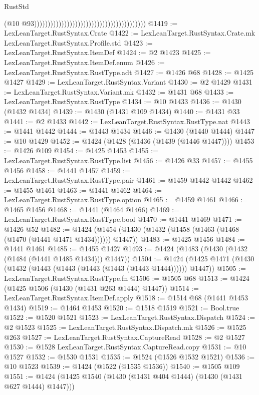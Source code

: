 \begin{lexlean}{RustStd}
\begin{coremodule}
                                                                                    (@10
                                                                                      @93)))))))))))))))))))))))))))))))))))))))))
@1419 := LexLeanTarget.RustSyntax.Crate
@1422 := LexLeanTarget.RustSyntax.Crate.mk LexLeanTarget.RustSyntax.Profile.std
@1423 := LexLeanTarget.RustSyntax.ItemDef
@1424 := @2 @1423
@1425 := LexLeanTarget.RustSyntax.ItemDef.enum
@1426 := LexLeanTarget.RustSyntax.RustType.adt
@1427 := @1426 @68
@1428 := @1425 @1427
@1429 := LexLeanTarget.RustSyntax.Variant
@1430 := @2 @1429
@1431 := LexLeanTarget.RustSyntax.Variant.mk
@1432 := @1431 @68
@1433 := LexLeanTarget.RustSyntax.RustType
@1434 := @10 @1433
@1436 := @1430 (@1432 @1434)
@1439 := @1430 (@1431 @109 @1434)
@1440 := @1431 @33
@1441 := @2 @1433
@1442 := LexLeanTarget.RustSyntax.RustType.nat
@1443 := @1441 @1442
@1444 := @1443 @1434
@1446 := @1430 (@1440 @1444)
@1447 := @10 @1429
@1452 := @1424 (@1428 (@1436 (@1439 (@1446 @1447))))
@1453 := @1426 @109
@1454 := @1425 @1453
@1455 := LexLeanTarget.RustSyntax.RustType.list
@1456 := @1426 @33
@1457 := @1455 @1456
@1458 := @1441 @1457
@1459 := LexLeanTarget.RustSyntax.RustType.pair
@1461 := @1459 @1442 @1442
@1462 := @1455 @1461
@1463 := @1441 @1462
@1464 := LexLeanTarget.RustSyntax.RustType.option
@1465 := @1459 @1461
@1466 := @1465 @1456
@1468 := @1441 (@1464 @1466)
@1469 := LexLeanTarget.RustSyntax.RustType.bool
@1470 := @1441 @1469
@1471 := @1426 @52
@1482 := @1424 (@1454 (@1430 (@1432 (@1458 (@1463 (@1468 (@1470 (@1441 @1471 @1434)))))) @1447))
@1483 := @1425 @1456
@1484 := @1441 @1461
@1485 := @1455 @1427
@1493 := @1424 (@1483 (@1430 (@1432 (@1484 (@1441 @1485 @1434))) @1447))
@1504 := @1424 (@1425 @1471 (@1430 (@1432 (@1443 (@1443 (@1443 (@1443 (@1443 @1444)))))) @1447))
@1505 := LexLeanTarget.RustSyntax.RustType.fn
@1506 := @1505 @68
@1513 := @1424 (@1425 @1506 (@1430 (@1431 @263 @1444) @1447))
@1514 := LexLeanTarget.RustSyntax.ItemDef.apply
@1518 := @1514 @68 (@1441 @1453 @1434)
@1519 := @1464 @1453
@1520 := @1518 @1519
@1521 := Bool.true
@1522 := @1520 @1521
@1523 := LexLeanTarget.RustSyntax.Dispatch
@1524 := @2 @1523
@1525 := LexLeanTarget.RustSyntax.Dispatch.mk
@1526 := @1525 @263
@1527 := LexLeanTarget.RustSyntax.CaptureRead
@1528 := @2 @1527
@1530 := @1528 LexLeanTarget.RustSyntax.CaptureRead.copy
@1531 := @10 @1527
@1532 := @1530 @1531
@1535 := @1524 (@1526 @1532 @1521)
@1536 := @10 @1523
@1539 := @1424 (@1522 (@1535 @1536))
@1540 := @1505 @109
@1551 := @1424 (@1425 @1540 (@1430 (@1431 @404 @1444) (@1430 (@1431 @627 @1444) @1447)))

\end{coremodule}
\end{lexlean}

